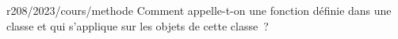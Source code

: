 \begin{question}{r208/2023/cours/methode}
Comment appelle-t-on une fonction définie dans une classe et qui
s'applique sur les objets de cette classe~?
%
\begin{reponses}
\end{reponses}
\end{question}

